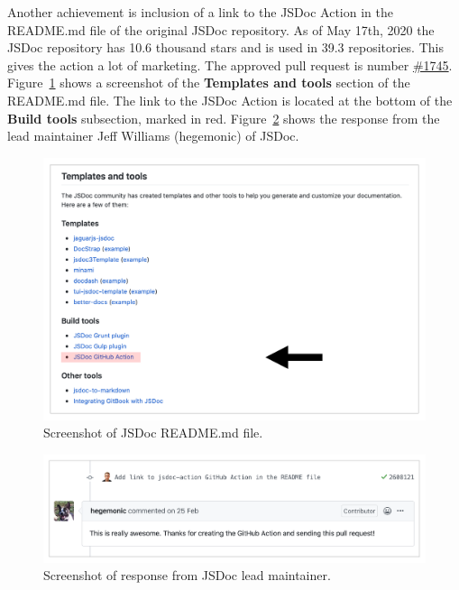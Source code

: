 Another achievement is inclusion of a link to the JSDoc Action in the README.md file of the original JSDoc repository. As of May 17th, 2020 the JSDoc repository has 10.6 thousand stars and is used in 39.3 repositories. This gives the action a lot of marketing. The approved pull request is number \href{https://github.com/jsdoc/jsdoc/pull/1745}{\#1745}. 
Figure~\ref{fig:jsdoc-link-readme} shows a screenshot of the \textbf{Templates and tools} section of the README.md file. The link to the JSDoc Action is located at the bottom of the \textbf{Build tools} subsection, marked in red.
Figure~\ref{fig:comment-hegemonic} shows the response from the lead maintainer Jeff Williams (hegemonic) of JSDoc.
\begin{figure}[htp]
    \centering
    \includegraphics[width=\textwidth]{sections/result/figures/jsdoc-readme.png}
    \caption{Screenshot of JSDoc README.md file.}
    \label{fig:jsdoc-link-readme}
\end{figure}
\begin{figure}[htp]
    \centering
    \includegraphics[width=\textwidth]{sections/result/figures/jsdoc-action-pull-request-approval-jsdoc.png}
    \caption{Screenshot of response from JSDoc lead maintainer.}
    \label{fig:comment-hegemonic}
\end{figure}
